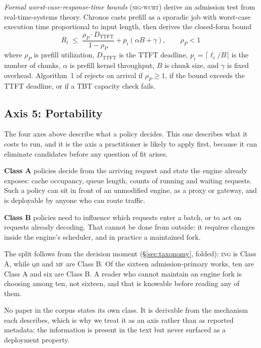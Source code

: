 \textit{Formal worst-case-response-time bounds} (\textsc{sig-wcrt})
derive an admission test from real-time-systems theory. Chronos casts prefill as a
sporadic job with worst-case execution time proportional to input
length, then derives the closed-form bound
%
\begin{equation}
R_i \;\le\; \frac{\rho_P \cdot D_{\text{TTFT}}}{1 - \rho_P} + p_i(\alpha B + \gamma), \qquad \rho_P < 1
\label{eq:chronos-wcrt}
\end{equation}
%
where $\rho_P$ is prefill utilization, $D_{\text{TTFT}}$ is the TTFT
deadline, $p_i = \lceil \ell_i / B \rceil$ is the number of chunks,
$\alpha$ is prefill kernel throughput, $B$ is chunk size, and $\gamma$
is fixed overhead. Algorithm~1 of \citep{marref2026chronos} rejects on
arrival if $\rho_P \ge 1$, if the bound exceeds the TTFT deadline, or
if a TBT capacity check fails.

\subsection{Axis 5: Portability}
\label{sec:axis-portability}

The four axes above describe what a policy decides. This one describes
what it costs to run, and it is the axis a practitioner is likely to
apply first, because it can eliminate candidates before any question of
fit arises.

\textbf{Class A} policies decide from the arriving request and state the
engine already exposes: cache occupancy, queue length, counts of running
and waiting requests. Such a policy can sit in front of an unmodified
engine, as a proxy or gateway, and is deployable by anyone who can route
traffic.

\textbf{Class B} policies need to influence which requests enter a
batch, or to act on requests already decoding. That cannot be done from
outside: it requires changes inside the engine's scheduler, and in
practice a maintained fork.

The split follows from the decision moment
(\S\ref{sec:taxonomy}, folded): \textsc{ing} is Class A, while
\textsc{qb} and \textsc{mf} are Class B. Of the sixteen
admission-primary works, ten are Class A and six are Class B. A reader
who cannot maintain an engine fork is choosing among ten, not sixteen,
and that is knowable before reading any of them.

No paper in the corpus states its own class. It is derivable from the
mechanism each describes, which is why we treat it as an axis rather
than as reported metadata: the information is present in the text but
never surfaced as a deployment property.

